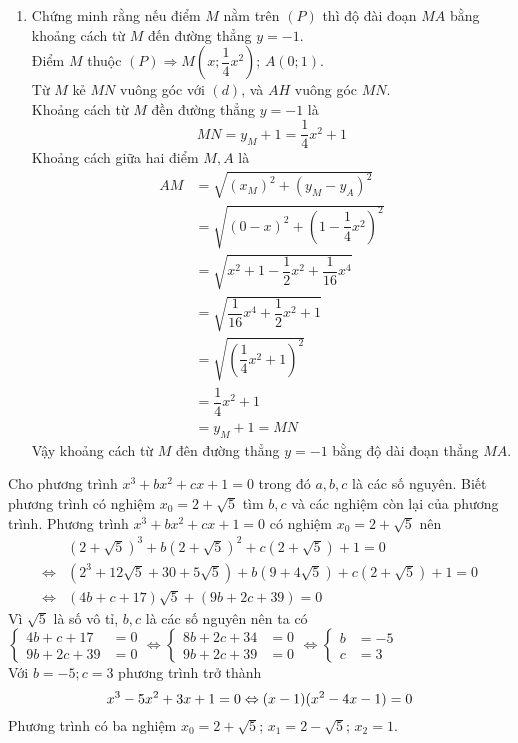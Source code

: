 \begin{ex}
{\begin{enumerate}
	\item Chứng minh rằng nếu điểm $M$ nằm trên $(P)$ thì độ đài đoạn $MA$ bằng khoảng cách từ $M$ đến đường thẳng $y=-1$.\\
	Điểm $M$ thuộc $(P) \Rightarrow M\left( x; \dfrac{1}{4}x^2 \right)$; $A(0;1)$.\\
	Từ $M$ kẻ $MN$ vuông góc với $(d)$, và $AH$ vuông góc $MN$.\\
	Khoảng cách từ $M$ đền đường thẳng $y=-1$ là
	$$MN=y_M + 1 = \dfrac{1}{4}x^2 +1$$
	Khoảng cách giữa hai điểm $M,A$ là
	\begin{align*}
	AM &= \sqrt{(x_M)^2 + (y_M - y_A)^2}\\
	&= \sqrt{(0-x)^2 + \left(1- \dfrac{1}{4}x^2 \right)^2}\\
	&= \sqrt{x^2+1- \dfrac{1}{2}x^2 +\dfrac{1}{16}x^4}\\
	&= \sqrt{\dfrac{1}{16}x^4 + \dfrac{1}{2}x^2 +1}\\
	&= \sqrt{\left( \dfrac{1}{4}x^2 +1\right)^2}\\
	&= \dfrac{1}{4}x^2 + 1\\
	&= y_M + 1 = MN
	\end{align*}
	Vậy khoảng cách từ $M$ đên đường thẳng $y=-1$ bằng độ dài đoạn thẳng $MA$. 
	\end{enumerate}
		}
\end{ex}
\begin{ex}%
	Cho phương trình $x^3+bx^2+cx+1=0$ trong đó $a,b,c$ là các số nguyên. Biết phương trình có nghiệm $x_0=2+\sqrt{5}$ tìm $b,c$ và các nghiệm còn lại của phương trình.
	\loigiai
	{Phương trình $x^3 + bx^2+ cx +1 = 0$ có nghiệm $x_0 = 2 + \sqrt{5}$ nên
	\begin{align*}	
	&(2+\sqrt{5})^3+ b (2+ \sqrt{5})^2 + c (2+ \sqrt{5})+1 = 0\\
\Leftrightarrow  &(2^3 + 12 \sqrt{5} + 30 + 5\sqrt{5})+b(9+ 4 \sqrt{5})+ c(2+\sqrt{5})+1=0\\
\Leftrightarrow & (4b+c+17)\sqrt{5} + (9b+2c+39)=0
\end{align*}
Vì $\sqrt{5}$ là số vô tỉ, $b,c$ là các số nguyên nên ta có \\
$\begin{cases}
4b+c+17&=0 \\ 9b+2c+39&=0 \end{cases} \Leftrightarrow \begin{cases} 8b+2c+34&=0 \\ 9b+2c+39&=0 \end{cases} \Leftrightarrow \begin{cases} b&=-5 \\ c&= 3 \end{cases}$\\
Với $b=-5;c=3$ phương trình trở thành
$$x^3 -5x^2+3x+1=0 \\ \Leftrightarrow (x-1)(x^2-4x-1)=0$$
	Phương trình có ba nghiệm $x_0 = 2 + \sqrt{5}$; $x_1 = 2- \sqrt{5}$; $x_2 =1.$
}
\end{ex}
